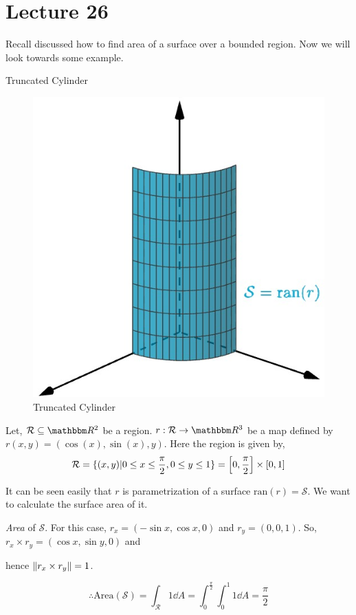 \documentclass[Analysis-3]{subfiles}
\begin{document}
\chapter*{Lecture 26} %
\setcounter{chapter}{26} %
\setcounter{section}{0}

Recall  discussed how to find area of a surface over a bounded region. Now we will look towards some example. 

\begin{Eg}{Truncated Cylinder}{}
    
    \begin{figure}
        \centering
        \includegraphics[width=.78\linewidth]{figures/lec-26.1.png}
        \caption{Truncated Cylinder}
    \end{figure}

 Let, $\mathcal{R} \subseteq \R^2$ be a region. $r : \mathcal{R} \to \R^3$ be a map defined by $r(x,y) = (\cos(x),\sin(x),y)$. Here the region is given by, 
\[\mathcal{R} = \{(x,y) | 0 \le x \le \frac{\pi}{2} , 0\le y \le 1\} = \qty[0,\frac{\pi}{2}] \times [0,1] \]

It can be seen easily that $r$ is parametrization of a surface $\text{ran}(r) = \mathcal{S}$. We want to calculate the surface area of it.

\textit{Area} of $\mathcal{S}$. For this case, $r_x = (-\sin x, \cos x, 0)$ and $r_y =(0,0,1)$. So, $ r_x \times r_y = (\cos x, \sin y,0)$ and 

\vspace{0.1cm}

hence $\norm{r_x \times r_y} = 1$.

\[\therefore \text{Area}(\mathcal{S}) = \int_{\mathcal{R}} 1 \dd A = \int_0^{\frac{\pi}{2}} \int_{0}^1 1 \dd A = \frac{\pi}{2}\]

\end{Eg}
\end{document}

